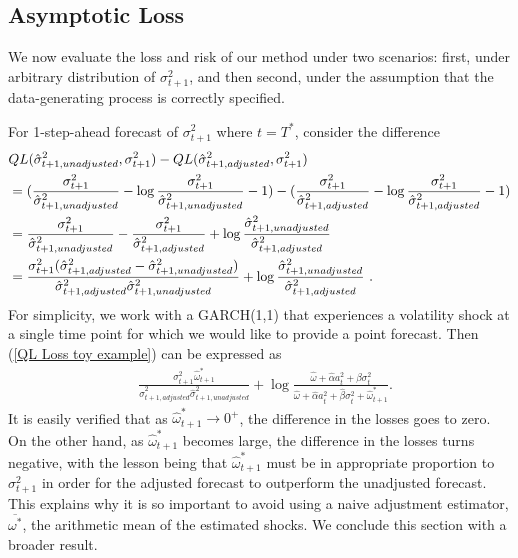 \documentclass[11pt,3p,review,authoryear]{elsarticle}
\theoremstyle{definition}
\begin{document}
\subsection{Asymptotic Loss}

We now evaluate the loss and risk of our method under two scenarios: first, under arbitrary distribution of $\sigma^{2}_{t+1}$, and then second, under the assumption that the data-generating process is correctly specified.

For 1-step-ahead forecast of $\sigma^{2}_{t+1}$ where $t=T^{*}$, consider the difference 
\begin{align}
  & QL(\hat\sigma_{t+1, unadjusted}^{2},\sigma^{2}_{t+1})-QL(\hat\sigma^{2}_{t+1, adjusted},\sigma^{2}_{t+1})\notag \\
   & =(\frac{\sigma_{t+1}^{2}}{\hat\sigma^{2}_{t+1,unadjusted}} - \log{\frac{\sigma_{t+1}^{2}}{\hat\sigma^{2}_{t+1,unadjusted}} } - 1) - (\frac{\sigma_{t+1}^{2}}{\hat\sigma^{2}_{t+1,adjusted}} - \log{\frac{\sigma_{t+1}^{2}}{\hat\sigma^{2}_{t+1,adjusted}}} - 1)\notag\\
   & = \frac{\sigma_{t+1}^{2}}{\hat\sigma^{2}_{t+1,unadjusted}} - \frac{\sigma_{t+1}^{2}}{\hat\sigma^{2}_{t+1,adjusted}}+ \log{\frac{\hat\sigma^{2}_{t+1,unadjusted}}{\hat\sigma^{2}_{t+1,adjusted}}}\notag\\
   & = \frac{\sigma_{t+1}^{2}(\hat\sigma^{2}_{t+1,adjusted}-\hat\sigma^{2}_{t+1,unadjusted})}{\hat\sigma^{2}_{t+1,adjusted}\hat\sigma^{2}_{t+1,unadjusted}} + \log{\frac{\hat\sigma^{2}_{t+1,unadjusted}}{\hat\sigma^{2}_{t+1,adjusted}}}\label{QL Loss toy example} \text{ .}
\end{align}
For simplicity, we work with a GARCH(1,1) that experiences a volatility shock at a single time point for which we would like to provide a point forecast.  Then (\ref{QL Loss toy example}) can be expressed as
\begin{align*}
   &\frac{\sigma^{2}_{t+1}\hat\omega^{*}_{t+1} }{\hat\sigma^{2}_{t+1,adjusted}\hat\sigma^{2}_{t+1,unadjusted}} + \log{\frac{\hat\omega + \hat\alpha a_{t}^{2} + \hat\beta\sigma_{t}^{2}}{\hat\omega + \hat\alpha a_{t}^{2} + \hat\beta\sigma_{t}^{2} + \hat\omega^{*}_{t+1}}}.
\end{align*}\label{QL Loss Consistency - GARCH(1,1)}
It is easily verified that as $\hat\omega^{*}_{t+1} \rightarrow 0^{+}$, the difference in the losses goes to zero.  On the other hand, as $\hat\omega^{*}_{t+1}$ becomes large, the difference in the losses turns negative, with the lesson being that $\hat\omega^{*}_{t+1}$ must be in appropriate proportion to $\sigma^{2}_{t+1}$ in order for the adjusted forecast to outperform the unadjusted forecast.  This explains why it is so important to avoid using a naive adjustment estimator, $\overline{\omega^{*}}$, the arithmetic mean of the estimated shocks.  We conclude this section with a broader result. 
\end{document}
